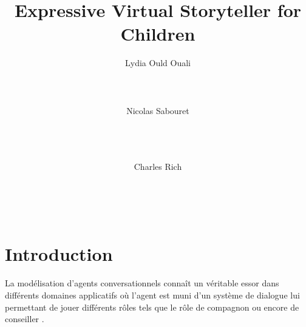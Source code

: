 \documentclass [french]{sig-alternate-05-2015}
\begin{document}
\title{Expressive Virtual Storyteller for Children}



\author{
\alignauthor Lydia Ould Ouali\\
       \\
       \\
       \\
\alignauthor Nicolas Sabouret\\
       \\
       \\
       \\
        \and
\alignauthor Charles Rich\\
       \\
       \\
       \\
}


\maketitle
\begin{abstract}

\end{abstract}



\section{Introduction}
La modélisation d’agents conversationnels connaît un véritable essor dans différents domaines applicatifs où l'agent est muni d'un système de dialogue lui permettant de jouer différents rôles tels que  le rôle de compagnon \cite{sidner2013always} ou encore de conseiller \cite{bickmore2005s}. 
\end{document}
